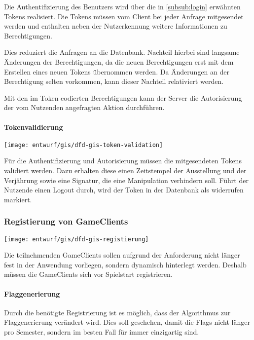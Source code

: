Die Authentifizierung des Benutzers wird über die in \autoref{subsub:login} erwähnten Tokens realisiert. Die Tokens müssen vom Client bei jeder Anfrage mitgesendet werden und enthalten neben der Nutzerkennung weitere Informationen zu Berechtigungen. 

Dies reduziert die Anfragen an die Datenbank. Nachteil hierbei sind langsame Änderungen der Berechtigungen, da die neuen Berechtigungen erst mit dem Erstellen eines neuen Tokens übernommen werden. Da Änderungen an der Berechtigung selten vorkommen, kann dieser Nachteil relativiert werden.

Mit den im Token codierten Berechtigungen kann der Server die Autorisierung der vom Nutzenden angefragten Aktion durchführen.

\paragraph{Tokenvalidierung}
\begin{center}
	\texttt{[image: entwurf/gis/dfd-gis-token-validation]}
\end{center}

Für die Authentifizierung und Autorisierung müssen die mitgesendeten Tokens validiert werden.
Dazu erhalten diese einen Zeitstempel der Ausstellung und der Verjährung sowie eine Signatur, die eine Manipulation verhindern soll. Führt der Nutzende einen Logout durch, wird der Token in der Datenbank als widerrufen markiert. 

\subsubsection{Registierung von GameClients}
\begin{center}
	\texttt{[image: entwurf/gis/dfd-gis-registierung]}
\end{center}

Die teilnehmenden GameClients sollen aufgrund der Anforderung nicht länger fest in der Anwendung vorliegen, sondern dynamisch hinterlegt werden. Deshalb müssen die GameClients sich vor Spielstart registrieren.

\paragraph{Flaggenerierung}
Durch die benötigte Registrierung ist es möglich, dass der Algorithmus zur Flaggenerierung verändert wird. Dies soll geschehen, damit die Flags nicht länger pro Semester, sondern im besten Fall für immer einzigartig sind.


